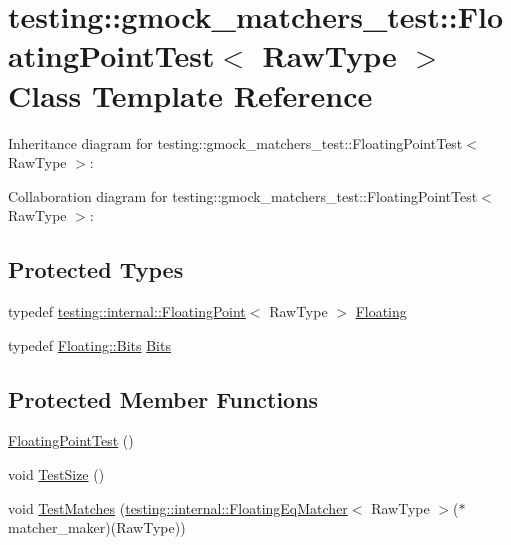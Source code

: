 \hypertarget{classtesting_1_1gmock__matchers__test_1_1_floating_point_test}{}\section{testing\+:\+:gmock\+\_\+matchers\+\_\+test\+:\+:Floating\+Point\+Test$<$ Raw\+Type $>$ Class Template Reference}
\label{classtesting_1_1gmock__matchers__test_1_1_floating_point_test}


Inheritance diagram for testing\+:\+:gmock\+\_\+matchers\+\_\+test\+:\+:Floating\+Point\+Test$<$ Raw\+Type $>$\+:


Collaboration diagram for testing\+:\+:gmock\+\_\+matchers\+\_\+test\+:\+:Floating\+Point\+Test$<$ Raw\+Type $>$\+:
\subsection*{Protected Types}
\begin{DoxyCompactItemize}
\item 
typedef \hyperlink{classtesting_1_1internal_1_1_floating_point}{testing\+::internal\+::\+Floating\+Point}$<$ Raw\+Type $>$ \hyperlink{classtesting_1_1gmock__matchers__test_1_1_floating_point_test_ae1459f93e1b18426625daf4fa98e80c6}{Floating}
\item 
typedef \hyperlink{classtesting_1_1internal_1_1_floating_point_abf228bf6cd48f12c8b44c85b4971a731}{Floating\+::\+Bits} \hyperlink{classtesting_1_1gmock__matchers__test_1_1_floating_point_test_addf899bd832ae51103198d201d2f2ea2}{Bits}
\end{DoxyCompactItemize}
\subsection*{Protected Member Functions}
\begin{DoxyCompactItemize}
\item 
\hyperlink{classtesting_1_1gmock__matchers__test_1_1_floating_point_test_af2fb52db3abf63903d78541c4c3a17d3}{Floating\+Point\+Test} ()
\item 
void \hyperlink{classtesting_1_1gmock__matchers__test_1_1_floating_point_test_ad6f8f0f5c939b7447a5717620b728018}{Test\+Size} ()
\item 
void \hyperlink{classtesting_1_1gmock__matchers__test_1_1_floating_point_test_a69d14d66bbd82f6b8bbe985046b59538}{Test\+Matches} (\hyperlink{classtesting_1_1internal_1_1_floating_eq_matcher}{testing\+::internal\+::\+Floating\+Eq\+Matcher}$<$ Raw\+Type $>$($\ast$matcher\+\_\+maker)(Raw\+Type))
\end{DoxyCompactItemize}
